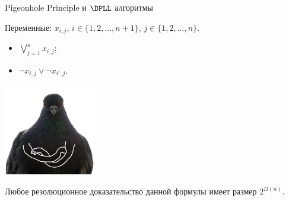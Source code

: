 \begin{frame}{Pigeonhole Principle и $\DPLL$ алгоритмы}

    Переменные: $x_{i, j}$, $i \in \{1, 2, \dots, n + 1\}$, $j \in \{1, 2, \dots, n\}$.
    \vspace{0.1cm}

    \pause
    \begin{itemize}
        \item $\bigvee\limits_{j = 1}^{n} x_{i, j}$;
        \item $\neg x_{i, j} \lor \neg x_{i', j}$.
    \end{itemize}

    \pause

    \vspace{0.2cm}
    \begin{minipage}{0.3\linewidth}
        \centering
        
    \end{minipage}
    \pause
    \begin{minipage}{0.68\linewidth}
        \centering
        \includegraphics[width = 0.3\textwidth]{pics/pigeon3.png}
        \pause
        \begin{theorem}[Haken 85]
            Любое резолюционное доказательство данной формулы имеет размер $2^{\Omega(n)}$.
        \end{theorem}
    \end{minipage}
    
\end{frame}
